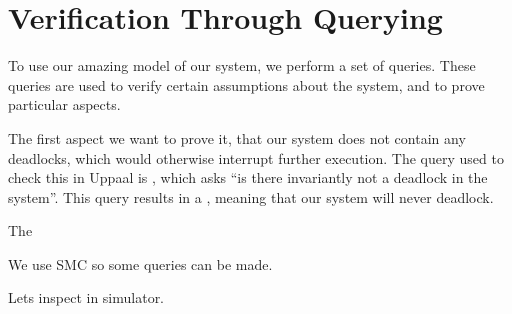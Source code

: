 \chapter{Verification Through Querying}
To use our amazing model of our system, we perform a set of queries.
These queries are used to verify certain assumptions about the system, and to prove particular aspects.

\bigskip
The first aspect we want to prove it, that our system does not contain any deadlocks, which would otherwise interrupt further execution.
The query used to check this in Uppaal is , which asks \enquote{is there invariantly not a deadlock in the system}.
This query results in a \success, meaning that our system will never deadlock.

The



We use SMC so some queries can be made.


Lets inspect in simulator.
